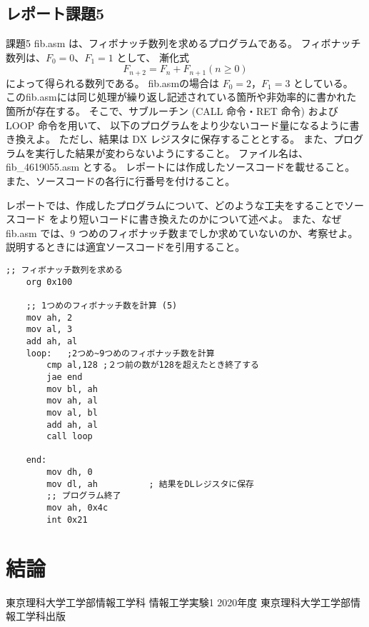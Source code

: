 \documentclass[12pt]{jarticle}
\begin{document}
\subsection{レポート課題5}
\begin{itembox}[l]{課題5}
	fib.asm は、フィボナッチ数列を求めるプログラムである。
	フィボナッチ数列は、$F_0 = 0$、$F_1 = 1$ として、
	漸化式
	$$F_{n+2} = F_n + F_{n+1}  (n \geq 0)$$
	によって得られる数列である。
	fib.asmの場合は $F_0 = 2$，$F_1 = 3$ としている。
	このfib.asmには同じ処理が繰り返し記述されている箇所や非効率的に書かれた箇所が存在する。
	そこで、サブルーチン (CALL 命令・RET 命令) および LOOP 命令を用いて、
	以下のプログラムをより少ないコード量になるように書き換えよ。
	ただし、結果は DX レジスタに保存することとする。
	また、プログラムを実行した結果が変わらないようにすること。
	ファイル名は、fib\_4619055.asm とする。
	レポートには作成したソースコードを載せること。
	また、ソースコードの各行に行番号を付けること。

	レポートでは、作成したプログラムについて、どのような工夫をすることでソースコード
	をより短いコードに書き換えたのかについて述べよ。
	また、なぜ fib.asm では、9 つめのフィボナッチ数までしか求めていないのか、考察せよ。
	説明するときには適宜ソースコードを引用すること。
\end{itembox}

\begin{lstlisting}[caption=fib\_4619055.asm,label=fib]
	;; フィボナッチ数列を求める
	org 0x100
	 
	;; 1つめのフィボナッチ数を計算 (5)
	mov ah, 2
	mov al, 3
	add ah, al
	loop:   ;2つめ~9つめのフィボナッチ数を計算
		cmp al,128 ;２つ前の数が128を超えたとき終了する
		jae end
		mov bl, ah
		mov ah, al
		mov al, bl
		add ah, al
		call loop
	 
	end:
		mov dh, 0
		mov dl, ah          ; 結果をDLレジスタに保存
		;; プログラム終了
		mov ah, 0x4c
		int 0x21
\end{lstlisting}


\section{結論}



\begin{thebibliography}{99}
	\label{sannkoubunnkenn_chapter}
	東京理科大学工学部情報工学科 情報工学実験1 2020年度
	東京理科大学工学部情報工学科出版
\end{thebibliography}

\clearpage
\appendix
\end{document}
